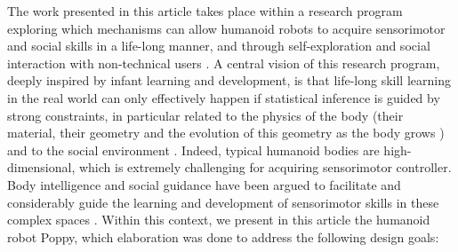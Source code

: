 The work presented in this article takes place within a research program exploring which mechanisms can allow humanoid robots to acquire sensorimotor and social skills in a life-long manner, and through self-exploration and social interaction with non-technical users \cite{Weng01}\cite{lungarella:03a}\cite{Oudeyer07}\cite{oudeyerEncyclo11}\cite{Oudeyer13}. A central vision of this research program, deeply inspired by infant learning and development, is that life-long skill learning in the real world can only effectively happen if statistical inference is guided by strong constraints, in particular related to the physics of the body (their material, their geometry and the evolution of this geometry as the body grows \cite{Berthouze04}\cite{Baranes11a}\cite{lapeyre2011maturational}) and to the social environment \cite{billard2008robot}\cite{argall2009survey}. Indeed, typical humanoid bodies are high-dimensional, which is extremely challenging for acquiring sensorimotor controller. Body intelligence and social guidance have been argued to facilitate and considerably guide the learning and development of sensorimotor skills in these complex spaces \cite{Oudeyer13}.
Within this context, we present in this article the humanoid robot Poppy, which elaboration was done to address the following design goals:
